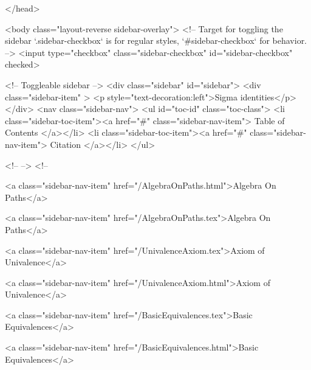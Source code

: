   
</head>




  <body class="layout-reverse sidebar-overlay">
    <!-- Target for toggling the sidebar `.sidebar-checkbox` is for regular
     styles, `#sidebar-checkbox` for behavior. -->
<input type="checkbox" class="sidebar-checkbox" id="sidebar-checkbox" checked>

<!-- Toggleable sidebar -->
<div class="sidebar" id="sidebar">
  <div class="sidebar-item" >
    <p style="text-decoration:left">Sigma identities</p>
  </div>
  <nav class="sidebar-nav">
    <ul id="toc-id" class="toc-class">
  <li class="sidebar-toc-item"><a href="#" class="sidebar-nav-item"> Table of Contents </a></li>
  <li class="sidebar-toc-item"><a href="#" class="sidebar-nav-item"> Citation </a></li>
</ul>


    <!--  -->
    <!-- 
      
    
      
    
      
    
      
    
      
        
      
    
      
        
          <a class="sidebar-nav-item" href="/AlgebraOnPaths.html">Algebra On Paths</a>
        
      
    
      
        
          <a class="sidebar-nav-item" href="/AlgebraOnPaths.tex">Algebra On Paths</a>
        
      
    
      
        
          <a class="sidebar-nav-item" href="/UnivalenceAxiom.tex">Axiom of Univalence</a>
        
      
    
      
        
          <a class="sidebar-nav-item" href="/UnivalenceAxiom.html">Axiom of Univalence</a>
        
      
    
      
        
          <a class="sidebar-nav-item" href="/BasicEquivalences.tex">Basic Equivalences</a>
        
      
    
      
        
          <a class="sidebar-nav-item" href="/BasicEquivalences.html">Basic Equivalences</a>
        
